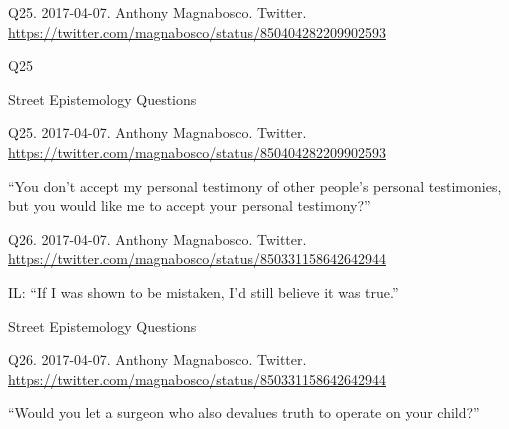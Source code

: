 \documentclass[
    src/templates/5x2-on-a4paper,
    frame
]{flashcards}
\newcommand{\myheader}{}
\newcommand{\myfooter}{
    \begin{flushright}
        \small\sc
        Street Epistemology Questions \par
    \end{flushright}
}
\begin{document}
        \renewcommand{\myheader}{
            \normalfont %
            \begin{tiny}
                Q25.
                2017-04-07.
                Anthony Magnabosco.
                    Twitter.
                    \\
                    \url{ https://twitter.com/magnabosco/status/850404282209902593 }
                \par
            \end{tiny}
        }
        \begin{flashcard}{
            \myheader
            \vspace{\fill}
            \begin{center}
                \large
                    Q25
            \end{center}
            \vspace{\fill}
            \myfooter
            \vspace{-1.4ex}
        }
            \myheader
            \vspace{\fill}
            \begin{center}
                \large
\enquote{You don't accept my personal testimony of other people's personal testimonies, but you would like me to accept your personal testimony?}            \end{center}
            \vspace{\fill}
        \end{flashcard}
        \renewcommand{\myheader}{
            \normalfont %
            \begin{tiny}
                Q26.
                2017-04-07.
                Anthony Magnabosco.
                    Twitter.
                    \\
                    \url{ https://twitter.com/magnabosco/status/850331158642642944 }
                \par
            \end{tiny}
        }
        \begin{flashcard}{
            \myheader
            \vspace{\fill}
            \begin{center}
                \large
                    IL: \enquote{If I was shown to be mistaken, I'd still believe it was true.}                    %
            \end{center}
            \vspace{\fill}
            \myfooter
            \vspace{-1.4ex}
        }
            \myheader
            \vspace{\fill}
            \begin{center}
                \large
\enquote{Would you let a surgeon who also devalues truth to operate on your child?}            \end{center}
            \vspace{\fill}
        \end{flashcard}
\end{document}
